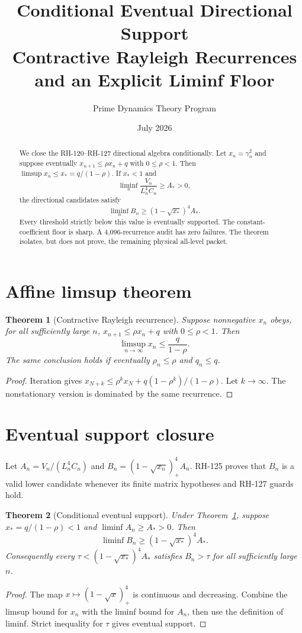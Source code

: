 \documentclass[12pt]{article}\usepackage[margin=1in]{geometry}\usepackage{amsmath,amssymb,amsthm,graphicx,natbib,microtype}\newtheorem{theorem}{Theorem}\newtheorem{corollary}[theorem]{Corollary}
\title{Conditional Eventual Directional Support\\\large Contractive Rayleigh Recurrences and an Explicit Liminf Floor}\author{Prime Dynamics Theory Program}\date{July 2026}
\begin{document}
\maketitle
\begin{abstract}
We close the RH-120--RH-127 directional algebra conditionally.  Let
$x_n=\gamma_n^2$ and suppose eventually
$x_{n+1}\leq\rho x_n+q$ with $0\leq\rho<1$.  Then
$\limsup x_n\leq x_*=q/(1-\rho)$.  If $x_*<1$ and
\[
\liminf_n\frac{V_n}{L_n^4C_n}\geq A_*>0,
\]
the directional candidates satisfy
\[
\liminf_n B_n\geq(1-\sqrt{x_*})^4A_*.
\]
Every threshold strictly below this value is eventually supported.  The
constant-coefficient floor is sharp.  A 4,096-recurrence audit has zero
failures.  The theorem isolates, but does not prove, the remaining physical
all-level packet.
\end{abstract}
\section{Affine limsup theorem}
\begin{theorem}[Contractive Rayleigh recurrence]\label{thm:affine}
Suppose nonnegative $x_n$ obeys, for all sufficiently large $n$,
$x_{n+1}\leq\rho x_n+q$ with $0\leq\rho<1$.  Then
\[
\limsup_{n\to\infty}x_n\leq\frac{q}{1-\rho}.
\]
The same conclusion holds if eventually $\rho_n\leq\rho$ and $q_n\leq q$.
\end{theorem}
\begin{proof}
Iteration gives
$x_{N+k}\leq\rho^kx_N+q(1-\rho^k)/(1-\rho)$.  Let $k\to\infty$.
The nonstationary version is dominated by the same recurrence.
\end{proof}

\section{Eventual support closure}
Let $A_n=V_n/(L_n^4C_n)$ and
$B_n=(1-\sqrt{x_n})_+^4A_n$.  RH-125 proves that $B_n$ is a valid lower
candidate whenever its finite matrix hypotheses and RH-127 guards hold.

\begin{theorem}[Conditional eventual support]\label{thm:support}
Under Theorem~\ref{thm:affine}, suppose
$x_*=q/(1-\rho)<1$ and $\liminf A_n\geq A_*>0$.  Then
\[
\liminf B_n\geq(1-\sqrt{x_*})^4A_*.
\]
Consequently every $\tau<(1-\sqrt{x_*})^4A_*$ satisfies $B_n>\tau$ for all
sufficiently large $n$.
\end{theorem}
\begin{proof}
The map $x\mapsto(1-\sqrt x)_+^4$ is continuous and decreasing.  Combine
the limsup bound for $x_n$ with the liminf bound for $A_n$, then use the
definition of liminf.  Strict inequality for $\tau$ gives eventual support.
\end{proof}
\end{document}
